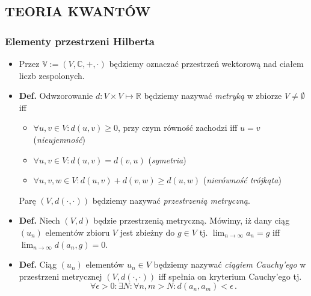 \documentclass{myclass}
\author{Bartosz Hanc}
\begin{document}
\subsection{TEORIA KWANTÓW}

\subsubsection{Elementy przestrzeni Hilberta}

\begin{itemize}

    \item Przez \(\mathbb{V} := (V,\mathbb{C},+,\cdot)\) będziemy oznaczać przestrzeń wektorową nad
    ciałem liczb zespolonych.

    \item \textbf{Def.} Odwzorowanie \(d: V \times V \mapsto \mathbb{R}\) będziemy nazywać
    \textit{metryką} w zbiorze \(V \neq \emptyset\) iff
    \begin{itemize}
    
        \item \(\forall u,v \in V : d(u,v) \geq 0\), przy czym równość zachodzi iff \(u = v\)
        (\textit{nieujemność})

        \item \(\forall u,v \in V : d(u,v) = d(v,u)\) (\textit{symetria})

        \item \(\forall u,v,w \in V : d(u,v) + d(v,w) \geq d(u,w)\) (\textit{nierówność trójkąta})

    \end{itemize}
    Parę \((V,d(\cdot,\cdot))\) będziemy nazywać \textit{przestrzenią metryczną}.

    \item \textbf{Def.} Niech \((V,d)\) będzie przestrzenią metryczną. Mówimy, iż dany ciąg
    \((u_n)\) elementów zbioru \(V\) jest zbieżny do \(g\in V\) tj. \(\lim_{n\to\infty}a_n = g\) iff
    \(\lim_{n\to\infty} d(a_n,g) = 0\).

    \item \textbf{Def.} Ciąg \((u_n)\) elementów \(u_n \in V\) będziemy nazywać \textit{ciągiem
    Cauchy'ego} w przestrzeni metrycznej \((V,d(\cdot,\cdot))\) iff spełnia on kryterium Cauchy'ego
    tj.
    \begin{equation*}
        \forall \epsilon > 0 : \exists N : \forall n,m > N : d(a_n,a_m) < \epsilon\,.
    \end{equation*}


\end{itemize}
\end{document}
